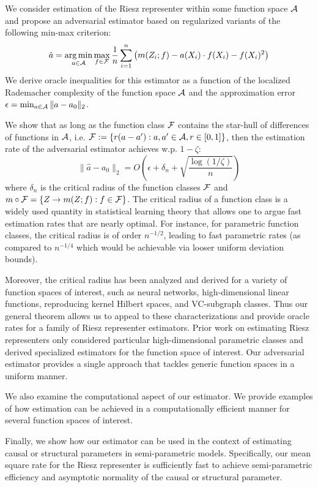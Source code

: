 We consider estimation of the Riesz representer within some function space ${\mathcal A}$ and propose an adversarial estimator based on regularized variants of the following min-max criterion:
\begin{equation}
    \hat{a} = \operatorname*{arg\,min}_{a\in {\mathcal A}} \max_{f\in {\mathcal F}} \frac{1}{n}\sum_{i=1}^n \left(m(Z_i;f) - a(X_i)\cdot f(X_i) - f(X_i)^2\right)
\end{equation}
We derive oracle inequalities for this estimator as a function of the localized Rademacher complexity of the function space ${\mathcal A}$ and the approximation error $\epsilon = \min_{a\in {\mathcal A}} \|a-a_0\|_{2}$.

We show that as long as the function class ${\mathcal F}$ contains the star-hull of differences of functions in ${\mathcal A}$, i.e. ${\mathcal F}:= \{r(a-a'): a, a'\in {\mathcal A}, r\in [0, 1]\}$, then the estimation rate of the adversarial estimator achieves w.p. $1-\zeta$:
\begin{equation}
    \|\hat{a} - a_0\|_2 = O\left(\epsilon + \delta_n + \sqrt{\frac{\log(1/\zeta)}{n}}\right)
\end{equation}
where $\delta_n$ is the critical radius of the function classes ${\mathcal F}$ and $m\circ {\mathcal F}=\{Z\to m(Z; f): f\in {\mathcal F}\}$. The critical radius of a function class is a widely used quantity in statistical learning theory that allows one to argue fast estimation rates that are nearly optimal. For instance, for parametric function classes, the critical radius is of order $n^{-1/2}$, leading to fast parametric rates (as compared to $n^{-1/4}$ which would be achievable via looser uniform deviation bounds).

Moreover, the critical radius has been analyzed and derived for a variety of function spaces of interest, such as neural networks, high-dimensional linear functions, reproducing kernel Hilbert spaces, and VC-subgraph classes. Thus our general theorem allows us to appeal to these characterizations and provide oracle rates for a family of Riesz representer estimators. Prior work on estimating Riesz representers only considered particular high-dimensional parametric classes and derived specialized estimators for the function space of interest. Our adversarial estimator provides a single approach that tackles generic function spaces in a uniform manner.

We also examine the computational aspect of our estimator. We provide examples of how estimation can be achieved in a computationally efficient manner for several function spaces of interest.

Finally, we show how our estimator can be used in the context of estimating causal or structural parameters in semi-parametric models. Specifically, our mean square rate for the Riesz representer is sufficiently fast to achieve semi-parametric efficiency and asymptotic normality of the causal or structural parameter.

